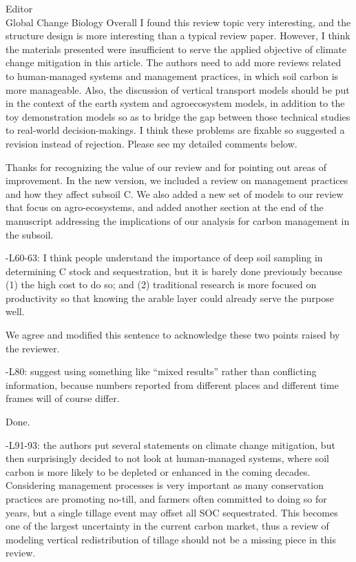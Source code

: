\documentclass[11pt]{bgcletter}
\newcommand{\answer}[1] {
{\color{cyan} #1}
}
\begin{document}
\begin{letter}{Editor\\
   Global Change Biology
}
Overall I found this review topic very interesting, and the structure design is more interesting than a typical review paper. However, I think the materials presented were insufficient to serve the applied objective of climate change mitigation in this article. The authors need to add more reviews related to human-managed systems and management practices, in which soil carbon is more manageable. Also, the discussion of vertical transport models should be put in the context of the earth system and agroecosystem models, in addition to the toy demonstration models so as to bridge the gap between those technical studies to real-world decision-makings. I think these problems are fixable so suggested a revision instead of rejection. Please see my detailed comments below.

\answer{Thanks for recognizing the value of our review and for pointing out areas of improvement. In the new version, we included a review on management practices and how they affect subsoil C. We also added a new set of models to our review that focus on agro-ecosystems, and added another section at the end of the manuscript addressing the implications of our analysis for carbon management in the subsoil. }

-L60-63: I think people understand the importance of deep soil sampling in determining C stock and sequestration, but it is barely done previously because (1) the high cost to do so; and (2) traditional research is more focused on productivity so that knowing the arable layer could already serve the purpose well.

\answer{We agree and modified this sentence to acknowledge these two points raised by the reviewer. }

-L80: suggest using something like ``mixed results'' rather than conflicting information, because numbers reported from different places and different time frames will of course differ.

\answer{Done.}

-L91-93: the authors put several statements on climate change mitigation, but then surprisingly decided to not look at human-managed systems, where soil carbon is more likely to be depleted or enhanced in the coming decades. Considering management processes is very important as many conservation practices are promoting no-till, and farmers often committed to doing so for years, but a single tillage event may offset all SOC sequestrated. This becomes one of the largest uncertainty in the current carbon market, thus a review of modeling vertical redistribution of tillage should not be a missing piece in this review.


\end{letter}
\end{document}
